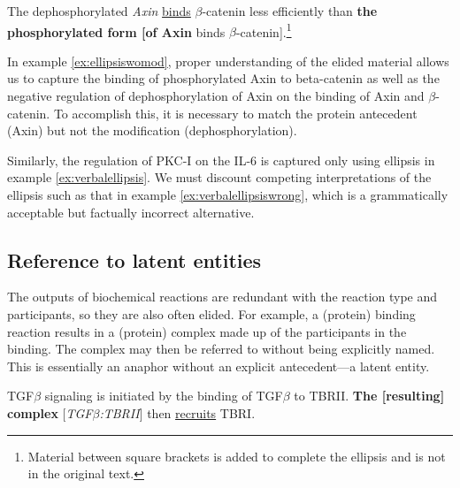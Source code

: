 \begin{exe}
	\ex\label{ex:ellipsiswomod} The dephosphorylated {\it Axin} \underline{binds} $\beta$-catenin less efficiently than 
{\bf the phosphorylated form [of Axin} binds $\beta$-catenin].\footnote{Material between square brackets is added to 
complete the ellipsis and is not in the original text.}
	\ex	\begin{xlist}
		\label{ex:verbalellipsis}
		\label{ex:verbalellipsiswrong}
		\end{xlist}
\end{exe}

In example \ref{ex:ellipsiswomod}, proper understanding of the elided material allows us to capture the binding of 
phosphorylated Axin to beta-catenin as well as the negative regulation of dephosphorylation of Axin on the binding of 
Axin and $\beta$-catenin. To accomplish this, it is necessary to match the protein antecedent (Axin) but not the 
modification (dephosphorylation).

Similarly, the regulation of PKC-I on the IL-6 is captured only using ellipsis in example \ref{ex:verbalellipsis}. We must 
discount competing interpretations of the ellipsis such as that in example \ref{ex:verbalellipsiswrong}, which is a 
grammatically acceptable but factually incorrect alternative.

\subsection{Reference to latent entities}

The outputs of biochemical reactions are redundant with the reaction type and participants, so they are also often 
elided. For example, a (protein) binding reaction results in a (protein) complex made up of the participants in the 
binding. The complex may then be referred to without being explicitly named. This is essentially an anaphor without an 
explicit antecedent---a latent entity.

\begin{exe}
	\ex\label{ex:latent1} TGF$\beta$ signaling is initiated by the binding of TGF$\beta$ to TBRII. {\bf The [resulting] 
complex} [{\it TGF$\beta$:TBRII}] then \underline{recruits} TBRI.
\end{exe}

